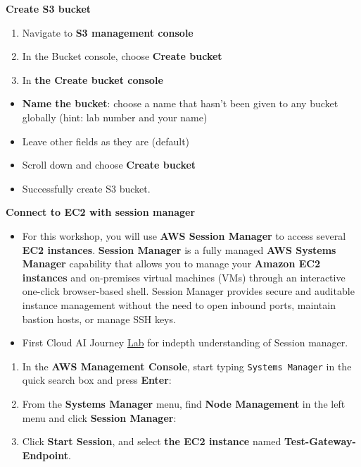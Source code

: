 \vspace{0.5em}\noindent\textbf{Create S3 bucket}\par

\begin{enumerate}
\def\labelenumi{\arabic{enumi}.}
\item
  Navigate to \textbf{S3 management console}
\item
  In the Bucket console, choose \textbf{Create bucket}
\item
  In \textbf{the Create bucket console}
\end{enumerate}

\begin{itemize}
\item
  \textbf{Name the bucket}: choose a name that hasn't been given to any
  bucket globally (hint: lab number and your name)
\item
  Leave other fields as they are (default)
\item
  Scroll down and choose \textbf{Create bucket}
\item
  Successfully create S3 bucket.
\end{itemize}

\vspace{0.5em}\noindent\textbf{Connect to EC2 with session
manager}\par

\begin{itemize}
\item
  For this workshop, you will use \textbf{AWS Session Manager} to access
  several \textbf{EC2 instances}. \textbf{Session Manager} is a fully
  managed \textbf{AWS Systems Manager} capability that allows you to
  manage your \textbf{Amazon EC2 instances} and on-premises virtual
  machines (VMs) through an interactive one-click browser-based shell.
  Session Manager provides secure and auditable instance management
  without the need to open inbound ports, maintain bastion hosts, or
  manage SSH keys.
\item
  First Cloud AI Journey
  \href{https://000058.awsstudygroup.com/1-introduce/}{Lab} for indepth
  understanding of Session manager.
\end{itemize}

\begin{enumerate}
\def\labelenumi{\arabic{enumi}.}
\item
  In the \textbf{AWS Management Console}, start typing
  \texttt{Systems\ Manager} in the quick search box and press
  \textbf{Enter}:
\item
  From the \textbf{Systems Manager} menu, find \textbf{Node Management}
  in the left menu and click \textbf{Session Manager}:
\item
  Click \textbf{Start Session}, and select \textbf{the EC2 instance}
  named \textbf{Test-Gateway-Endpoint}.
\end{enumerate}

